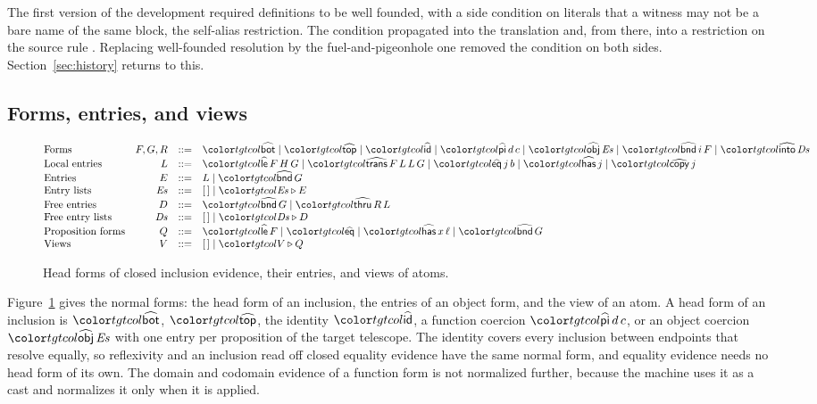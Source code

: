 The first version of the development required definitions to be well founded, with a side condition on literals that a witness may not be a bare name of the same block, the self-alias restriction. The condition propagated into the translation and, from there, into a restriction on the source rule . Replacing well-founded resolution by the fuel-and-pigeonhole one removed the condition on both sides. Section~\ref{sec:history} returns to this.

\subsection{Forms, entries, and views}

\begin{figure}
\small
\color{tgtcol}
\[
\begin{array}{@{}lrcl@{}}
\text{Forms} & F,G,R & ::= & \form{bot} \mid \form{top} \mid \form{id} \mid \form{pi}\,d\,c \mid \form{obj}\,\mathit{Es} \mid \form{bnd}\,i\,F \mid \form{into}\,\mathit{Ds} \\
\text{Local entries} & L & ::= & \form{le}\,F\,H\,G \mid \form{trans}\,F\,L\,L\,G \mid \form{eq}\,j\,b \mid \form{has}\,j \mid \form{copy}\,j \\
\text{Entries} & E & ::= & L \mid \form{bnd}\,G \\
\text{Entry lists} & \mathit{Es} & ::= & \tnil \mid \tcons{\mathit{Es}}{E} \\
\text{Free entries} & D & ::= & \form{bnd}\,G \mid \form{thru}\,R\,L \\
\text{Free entry lists} & \mathit{Ds} & ::= & \tnil \mid \tcons{\mathit{Ds}}{D} \\
\text{Proposition forms} & Q & ::= & \form{le}\,F \mid \form{eq} \mid \form{has}\,x\,\ell \mid \form{bnd}\,G \\
\text{Views} & V & ::= & \tnil \mid \tcons{V}{Q}
\end{array}
\]
\color{black}
\caption{Head forms of closed inclusion evidence, their entries, and views of atoms.}
\label{fig:forms}
\end{figure}

Figure~\ref{fig:forms} gives the normal forms: the head form of an inclusion, the entries of an object form, and the view of an atom. A head form of an inclusion is $\form{bot}$, $\form{top}$, the identity $\form{id}$, a function coercion $\form{pi}\,d\,c$, or an object coercion $\form{obj}\,\mathit{Es}$ with one entry per proposition of the target telescope. The identity covers every inclusion between endpoints that resolve equally, so reflexivity and an inclusion read off closed equality evidence have the same normal form, and equality evidence needs no head form of its own. The domain and codomain evidence of a function form is not normalized further, because the machine uses it as a cast and normalizes it only when it is applied.

